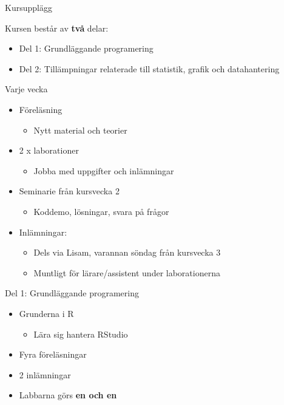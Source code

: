 \documentclass[
  10pt,
  ignorenonframetext,
]{beamer}
\providecommand{\tightlist}{%
  \setlength{\itemsep}{0pt}\setlength{\parskip}{0pt}}
\begin{document}
\begin{frame}{Kursupplägg}
\protect\hypertarget{kursuppluxe4gg}{}
\begin{block}{Kursen består av \textbf{två} delar:}
\protect\hypertarget{kursen-bestuxe5r-av-tvuxe5-delar}{}
\begin{itemize}
\tightlist
\item
  Del 1: Grundläggande programering
\item
  Del 2: Tillämpningar relaterade till statistik, grafik och
  datahantering
\end{itemize}

\pause
\end{block}

\begin{block}{Varje vecka}
\protect\hypertarget{varje-vecka}{}
\begin{itemize}
\tightlist
\item
  Föreläsning

  \begin{itemize}
  \tightlist
  \item
    Nytt material och teorier
  \end{itemize}
\item
  2 x laborationer

  \begin{itemize}
  \tightlist
  \item
    Jobba med uppgifter och inlämningar
  \end{itemize}
\item
  Seminarie från kursvecka 2

  \begin{itemize}
  \tightlist
  \item
    Koddemo, lösningar, svara på frågor
  \end{itemize}
\item
  Inlämningar:

  \begin{itemize}
  \tightlist
  \item
    Dels via Lisam, varannan söndag från kursvecka 3
  \item
    Muntligt för lärare/assistent under laborationerna
  \end{itemize}
\end{itemize}
\end{block}
\end{frame}

\begin{frame}{Del 1: Grundläggande programering}
\protect\hypertarget{del-1-grundluxe4ggande-programering}{}
\begin{itemize}
\tightlist
\item
  Grunderna i R

  \begin{itemize}
  \tightlist
  \item
    Lära sig hantera RStudio
  \end{itemize}
\item
  Fyra föreläsningar
\item
  2 inlämningar
\item
  Labbarna görs \textbf{en och en}
\end{itemize}
\end{frame}
\end{document}
